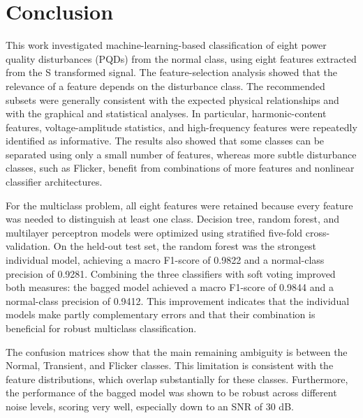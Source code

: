 \section{Conclusion}

This work investigated machine-learning-based classification of eight power quality disturbances (PQDs) from the normal class, using eight features extracted from the S transformed signal. The feature-selection analysis showed that the relevance of a feature depends on the disturbance class. The recommended subsets were generally consistent with the expected physical relationships and with the graphical and statistical analyses. In particular, harmonic-content features, voltage-amplitude statistics, and high-frequency features were repeatedly identified as informative. The results also showed that some classes can be separated using only a small number of features, whereas more subtle disturbance classes, such as Flicker, benefit from combinations of more features and nonlinear classifier architectures.

For the multiclass problem, all eight features were retained because every feature was needed to distinguish at least one class. Decision tree, random forest, and multilayer perceptron models were optimized using stratified five-fold cross-validation. On the held-out test set, the random forest was the strongest individual model, achieving a macro F1-score of 0.9822 and a normal-class precision of 0.9281. Combining the three classifiers with soft voting improved both measures: the bagged model achieved a macro F1-score of 0.9844 and a normal-class precision of 0.9412. This improvement indicates that the individual models make partly complementary errors and that their combination is beneficial for robust multiclass classification.

The confusion matrices show that the main remaining ambiguity is between the Normal, Transient, and Flicker classes. This limitation is consistent with the feature distributions, which overlap substantially for these classes. Furthermore, the performance of the bagged model was shown to be robust across different noise levels, scoring very well, especially down to an SNR of 30 dB.

